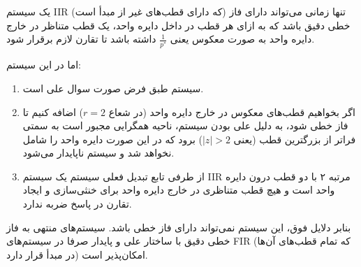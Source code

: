 یک سیستم IIR (که دارای قطب‌های غیر از مبدأ است) تنها زمانی می‌تواند دارای فاز خطی دقیق باشد که به ازای هر قطب در داخل دایره واحد، یک قطب متناظر در خارج دایره واحد به صورت معکوس یعنی $\frac{1}{p^*}$ داشته باشد تا تقارن لازم برقرار شود. 

اما در این سیستم:
\begin{enumerate}
    \item سیستم طبق فرض صورت سوال {علی} است.
    \item اگر بخواهیم قطب‌های معکوس در خارج دایره واحد (در شعاع $r=2$) اضافه کنیم تا فاز خطی شود، به دلیل علی بودن سیستم، ناحیه همگرایی مجبور است به سمتی فراتر از بزرگترین قطب (یعنی $|z| > 2$) برود که در این صورت دایره واحد را شامل نخواهد شد و سیستم ناپایدار می‌شود.
    \item از طرفی تابع تبدیل فعلی سیستم یک سیستم IIR مرتبه ۲ با دو قطب درون دایره واحد است و هیچ قطب متناظری در خارج دایره واحد برای خنثی‌سازی و ایجاد تقارن در پاسخ ضربه ندارد.
\end{enumerate}

بنابر دلایل فوق، این سیستم نمی‌تواند دارای فاز خطی باشد. سیستم‌های منتهی به فاز خطی دقیق با ساختار علی و پایدار صرفا در سیستم‌های FIR (که تمام قطب‌های آن‌ها در مبدأ قرار دارد) امکان‌پذیر است.
